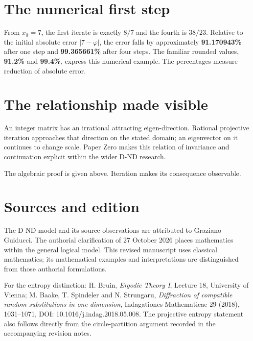 \documentclass[10pt,a4paper]{article}
\begin{document}
\section*{The numerical first step}

From $x_0=7$, the first iterate is exactly $8/7$ and the fourth is $38/23$. Relative to the initial absolute error $|7-\varphi|$, the error falls by approximately \textbf{91.170943\%} after one step and \textbf{99.365661\%} after four steps. The familiar rounded values, \textbf{91.2\%} and \textbf{99.4\%}, express this numerical example. The percentages measure reduction of absolute error.
\par

\section*{The relationship made visible}

An integer matrix has an irrational attracting eigen-direction. Rational projective iteration approaches that direction on the stated domain; an eigenvector on it continues to change scale. Paper Zero makes this relation of invariance and continuation explicit within the wider D-ND research.
\par

The algebraic proof is given above. Iteration makes its consequence observable.
\par

\section*{Sources and edition}

The D-ND model and its source observations are attributed to Graziano Guiducci. The authorial clarification of 27 October 2026 places mathematics within the general logical model. This revised manuscript uses classical mathematics; its mathematical examples and interpretations are distinguished from those authorial formulations.
\par

For the entropy distinction: H. Bruin, \emph{Ergodic Theory I}, Lecture 18, University of Vienna; M. Baake, T. Spindeler and N. Strungaru, \emph{Diffraction of compatible random substitutions in one dimension}, Indagationes Mathematicae 29 (2018), 1031--1071, DOI: 10.1016/j.indag.2018.05.008. The projective entropy statement also follows directly from the circle-partition argument recorded in the accompanying revision notes.
\par
\end{document}
